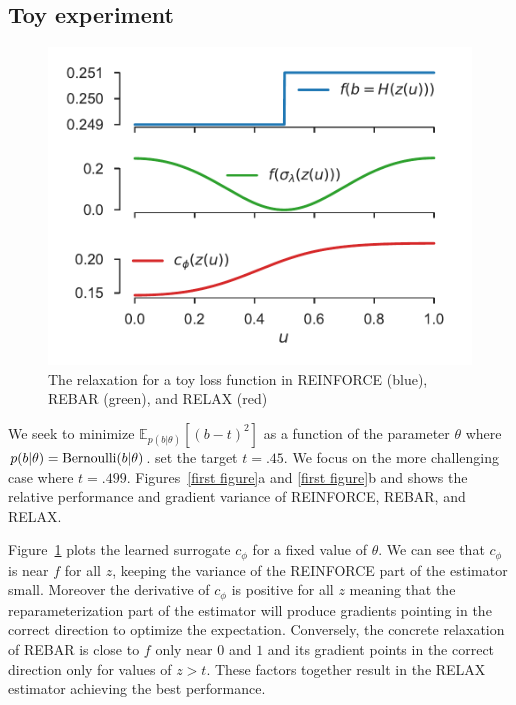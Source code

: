 \documentclass{article}
\begin{document}
\subsection{Toy experiment}
\begin{figure}
	\centering
		\vspace{-3mm}
	\hspace{-2.5mm}\includegraphics[width=0.50\columnwidth ]{figures/relaxations_t_499_which_2} 
		\vspace*{-6mm}
	\caption{ The relaxation for a toy loss function in REINFORCE (blue), REBAR (green), and RELAX (red)} 
	\label{learned-relaxations}
\end{figure}
We seek to minimize $\mathbb{E}_{p(b|\theta)}[(b - t)^2]$ as a function of the parameter $\theta$ where {$p(b|\theta) = \textnormal{Bernoulli}(b|\theta)$}. \cite{tucker2017rebar} set the target $t = .45$.
We focus on the more challenging case where $t = .499$.
Figures~\ref{first figure}a and \ref{first figure}b and shows the relative performance and gradient variance of REINFORCE, REBAR, and RELAX.


Figure~\ref{learned-relaxations} plots the learned surrogate $c_\phi$ for a fixed value of $\theta$. We can see that $c_\phi$ is near $f$ for all $z$, keeping the variance of the REINFORCE part of the estimator small. Moreover the derivative of $c_\phi$ is positive for all $z$ meaning that the reparameterization part of the estimator will produce gradients pointing in the correct direction to optimize the expectation. Conversely, the concrete relaxation of REBAR is close to $f$ only near $0$ and $1$ and its gradient points in the correct direction only for values of $z > t$. These factors together result in the RELAX estimator achieving the best performance. 
\end{document}
